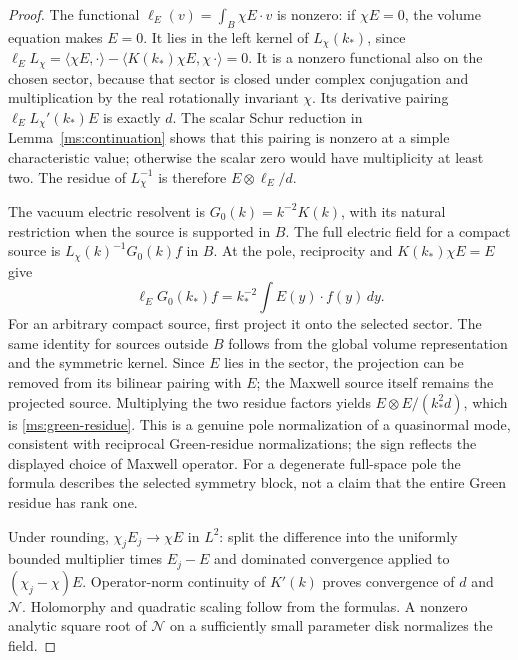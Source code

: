 \begin{proof}
The functional $\ell_E(v)=\int_B\chi E\cdot v$ is nonzero:
if $\chi E=0$, the volume equation makes $E=0$.  It lies in the
left kernel of $L_\chi(k_*)$, since
$\ell_E L_\chi=\langle\chi E,\cdot\rangle-
\langle K(k_*)\chi E,\chi\,\cdot\rangle=0$.
It is a nonzero functional also on the chosen sector, because that
sector is closed under complex conjugation and multiplication by
the real rotationally invariant $\chi$.  Its derivative pairing
$\ell_E L_\chi'(k_*)E$ is exactly $d$.
The scalar Schur reduction in Lemma~\ref{ms:continuation} shows
that this pairing is nonzero at a simple characteristic value;
otherwise the scalar zero would have multiplicity at least two.
The residue of $L_\chi^{-1}$ is therefore
$E\otimes\ell_E/d$.

The vacuum electric resolvent is $G_0(k)=k^{-2}K(k)$, with its
natural restriction when the source is supported in $B$.
The full electric field for a compact source is
$L_\chi(k)^{-1}G_0(k)f$ in $B$.  At the pole, reciprocity and
$K(k_*)\chi E=E$ give
\begin{equation}
 \ell_E G_0(k_*)f=k_*^{-2}\int E(y)\cdot f(y)\,dy.
\end{equation}
For an arbitrary compact source, first project it onto the selected
sector.  The same identity for sources outside $B$ follows from
the global volume representation and the symmetric kernel.  Since
$E$ lies in the sector, the projection can be removed from its
bilinear pairing with $E$; the Maxwell source itself remains the
projected source.
Multiplying the two residue factors yields
$E\otimes E/(k_*^2d)$, which is
\eqref{ms:green-residue}.  This is a genuine pole normalization
of a quasinormal mode, consistent with reciprocal Green-residue
normalizations\cite{muljarov2016}; the sign reflects the displayed
choice of Maxwell operator.  For a degenerate full-space pole the
formula describes the selected symmetry block, not a claim that
the entire Green residue has rank one.

Under rounding, $\chi_j E_j\to\chi E$ in $L^2$: split the
difference into the uniformly bounded multiplier times $E_j-E$
and dominated convergence applied to $(\chi_j-\chi)E$.
Operator-norm continuity of $K'(k)$ proves convergence of $d$
and $\mathcal N$.  Holomorphy and quadratic scaling follow from
the formulas.  A nonzero analytic square root of $\mathcal N$
on a sufficiently small parameter disk normalizes the field.
\end{proof}

